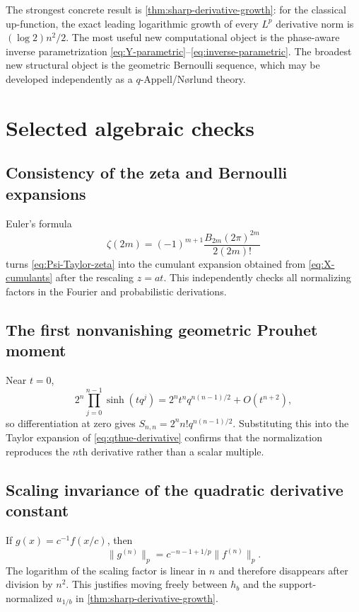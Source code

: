 \documentclass[11pt,oneside]{article}
\theoremstyle{definition}
\theoremstyle{remark}
\begin{document}
The strongest concrete result is \cref{thm:sharp-derivative-growth}: for the classical
up-function, the exact leading logarithmic growth of every $L^p$ derivative norm is
$(\log2)n^2/2$.  The most useful new computational object is the phase-aware inverse
parametrization \eqref{eq:Y-parametric}--\eqref{eq:inverse-parametric}.  The broadest
new structural object is the geometric Bernoulli sequence, which may be developed
independently as a $q$-Appell/N\o rlund theory.

\appendix

\section{Selected algebraic checks}

\subsection{Consistency of the zeta and Bernoulli expansions}

Euler's formula
\[
 \zeta(2m)=(-1)^{m+1}\frac{B_{2m}(2\pi)^{2m}}{2(2m)!}
\]
turns \eqref{eq:Psi-Taylor-zeta} into the cumulant expansion obtained from
\eqref{eq:X-cumulants} after the rescaling $z=at$.  This independently checks all
normalizing factors in the Fourier and probabilistic derivations.

\subsection{The first nonvanishing geometric Prouhet moment}

Near $t=0$,
\[
 2^n\prod_{j=0}^{n-1}\sinh(tq^j)
 =2^nt^nq^{n(n-1)/2}+O(t^{n+2}),
\]
so differentiation at zero gives
$S_{n,n}=2^nn!q^{n(n-1)/2}$.  Substituting this into the Taylor expansion of
\eqref{eq:qthue-derivative} confirms that the normalization reproduces the $n$th
derivative rather than a scalar multiple.

\subsection{Scaling invariance of the quadratic derivative constant}

If $g(x)=c^{-1}f(x/c)$, then
\[
 \|g^{(n)}\|_p=c^{-n-1+1/p}\|f^{(n)}\|_p.
\]
The logarithm of the scaling factor is linear in $n$ and therefore disappears after
division by $n^2$.  This justifies moving freely between $h_b$ and the support-normalized
$u_{1/b}$ in \cref{thm:sharp-derivative-growth}.
\end{document}
